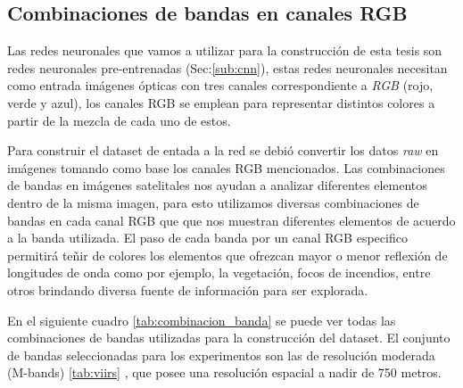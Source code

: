 \subsection{Combinaciones de bandas en canales RGB}\label{sub:comb_de_banda} 

Las redes neuronales que vamos a utilizar para la construcción de esta tesis son redes neuronales pre-entrenadas (Sec:\ref{sub:cnn}), estas redes neuronales necesitan como entrada imágenes ópticas con tres canales correspondiente a \textit{RGB} (rojo, verde y azul), los canales RGB se emplean para representar distintos colores a partir de la mezcla de cada uno de estos.

Para construir el dataset de entada a la red se debió convertir los datos \textit{raw} en imágenes tomando como base los canales RGB mencionados. Las combinaciones de bandas en imágenes satelitales nos ayudan a analizar diferentes elementos dentro de la misma imagen, para esto utilizamos diversas combinaciones de bandas en cada canal RGB que que nos muestran diferentes elementos de acuerdo a la banda utilizada. El paso de cada banda por un canal RGB especifico permitirá teñir de colores los elementos que ofrezcan mayor o menor reflexión de longitudes de onda como por ejemplo, la vegetación, focos de incendios, entre otros brindando diversa fuente de información para ser explorada. 

En el siguiente cuadro  \ref{tab:combinacion_banda} se puede ver todas las combinaciones de bandas utilizadas para la construcción del dataset. El conjunto de bandas seleccionadas para los experimentos son las de resolución moderada (M-bands) \ref{tab:viirs} , que posee una resolución espacial a nadir de 750 metros.

